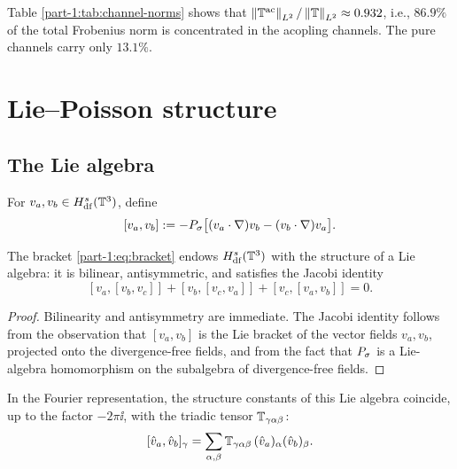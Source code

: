 \begin{remark}\label{part-1:rem:frac-ac}
Table \ref{part-1:tab:channel-norms} shows that 
$\left\lVert \mathbb{T}^{\mathrm{ac}} \right\rVert_{L^2}/\left\lVert \mathbb{T} \right\rVert_{L^2} \approx 0.932$, i.e., 
$86.9\%$ of the total Frobenius norm is concentrated in the acopling 
channels. The pure channels carry only $13.1\%$.
\end{remark}

\section{Lie--Poisson structure}
\label{part-1:sec:structure}

\subsection{The Lie algebra}
\label{part-1:ssec:lie-algebra}

\begin{definition}[Bracket]\label{part-1:def:bracket}
For $v_a, v_b \in H^s_{\mathrm{df}}(\mathbb{T}^3)$, define
\begin{equation}\label{part-1:eq:bracket}
[v_a, v_b] := -P_\sigma\bigl[(v_a\cdot\nabla)v_b - (v_b\cdot\nabla)v_a\bigr].
\end{equation}
\end{definition}

\begin{proposition}\label{part-1:prop:lie-algebra}
The bracket \eqref{part-1:eq:bracket} endows $H^s_{\mathrm{df}}(\mathbb{T}^3)$ with 
the structure of a Lie algebra: it is bilinear, antisymmetric, and 
satisfies the Jacobi identity
\begin{equation}\label{part-1:eq:Jacobi}
[v_a, [v_b, v_c]] + [v_b, [v_c, v_a]] + [v_c, [v_a, v_b]] = 0.
\end{equation}
\end{proposition}

\begin{proof}
Bilinearity and antisymmetry are immediate. The Jacobi identity follows 
from the observation that $[v_a, v_b]$ is the Lie bracket of the 
vector fields $v_a, v_b$, projected onto the divergence-free fields, 
and from the fact that $P_\sigma$ is a Lie-algebra homomorphism on the 
subalgebra of divergence-free fields.
\end{proof}

In the Fourier representation, the structure constants of this Lie 
algebra coincide, up to the factor $-2\pi\ii$, with the triadic tensor 
$\mathbb{T}_{\gamma\alpha\beta}$:
\begin{equation}\label{part-1:eq:structure-constants}
[\hat v_a, \hat v_b]_\gamma = \sum_{\alpha,\beta} \mathbb{T}_{\gamma\alpha\beta} 
\,(\hat v_a)_\alpha (\hat v_b)_\beta.
\end{equation}

